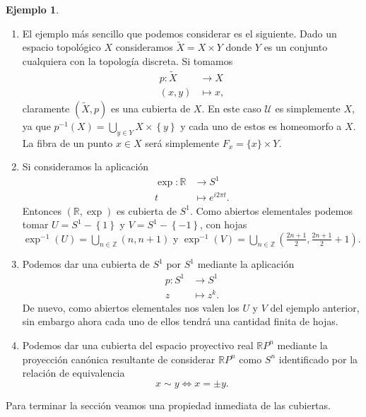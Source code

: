 \documentclass[12pt,a4paper]{book}
\theoremstyle{definition} \newtheorem{defn}[thm]{Definición}
\theoremstyle{definition} \newtheorem{ejemplo}[thm]{Ejemplo}
\theoremstyle{definition} \newtheorem{ejercicio}[thm]{Ejercicio}
\theoremstyle{remark} \newtheorem*{obs}{Observación}
\def\ZZ{\mathbb{Z}}
\def\RR{\mathbb{R}}
\def\XX{\tilde{X}}
\begin{document}
\begin{ejemplo}\leavevmode
  \begin{enumerate}
    \item El ejemplo más sencillo que podemos considerar es el siguiente. Dado un espacio topológico $X$ consideramos $\XX=X\times Y$ donde $Y$ es un conjunto cualquiera con la topología discreta. Si tomamos 
      \begin{align*}
	p :\XX&\longrightarrow X\\ 
	  (x,y) &\longmapsto x,
	\end{align*}
	claramente $(\XX,p)$ es una cubierta de $X$. En este caso $\mathcal{U}$ es simplemente $X$, ya que $p^{-1}(X)=\bigcup_{y\in Y}X\times\left\{ y \right\}$ y cada uno de estos es homeomorfo a $X$. La fibra de un punto $x\in X$ será simplemente $F_x=\{x\}\times Y$.
      \item Si consideramos la aplicación
	\begin{align*}
	  \exp :\RR&\longrightarrow S^1\\ 
	  t &\longmapsto e^{i2\pi t}. 
	  \end{align*}
	  Entonces $(\RR,\exp)$ es cubierta de $S^1$. Como abiertos elementales podemos tomar $U=S^1-\left\{ 1 \right\}$ y $V=S^1-\left\{ -1 \right\}$, con hojas $\exp^{-1}(U)=\bigcup_{n\in \ZZ}(n,n+1)$ y $\exp^{-1}(V)=\bigcup_{n\in \ZZ}(\tfrac{2n+1}{2},\tfrac{2n+1}{2}+1)$. 
	\item Podemos dar una cubierta de $S^1$ por $S^1$ mediante la aplicación 
	  \begin{align*}
	    p :S^1&\longrightarrow S^1\\ 
	      z &\longmapsto z^k. 
	    \end{align*}
	    De nuevo, como abiertos elementales nos valen los $U$ y $V$ del ejemplo anterior, sin embargo ahora cada uno de ellos tendrá una cantidad finita de hojas.
	  \item Podemos dar una cubierta del espacio proyectivo real $\RR P^n$ mediante la proyección canónica resultante de considerar $\RR P^n$ como $S^n$ identificado por la relación de equivalencia   \begin{equation*}
	      x\sim y \Leftrightarrow x=\pm y .
	    \end{equation*}
  \end{enumerate}
\end{ejemplo}

Para terminar la sección veamos una propiedad inmediata de las cubiertas.
\end{document}
